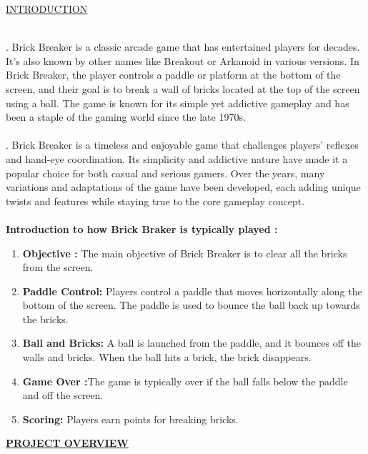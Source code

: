 \documentclass{article}
\begin{document}
\begin{center}
\huge \underline{INTRODUCTION}
\end{center}
\\
\LARGE {}. Brick Breaker is a classic arcade game that has entertained players for decades. It's also known by other names like Breakout or Arkanoid in various versions. In Brick Breaker, the player controls a paddle or platform at the bottom of the screen, and their goal is to break a wall of bricks located at the top of the screen using a ball. The game is known for its simple yet addictive gameplay and has been a staple of the gaming world since the late 1970s. \\
\textbf{}\\
\LARGE {}. Brick Breaker is a timeless and enjoyable game that challenges players' reflexes and hand-eye coordination. Its simplicity and addictive nature have made it a popular choice for both casual and serious gamers. Over the years, many variations and adaptations of the game have been developed, each adding unique twists and features while staying true to the core gameplay concept.\\
\\
\LARGE{\textbf{Introduction to how Brick Braker is typically played :}}
\begin{enumerate}
    \item [\bullet] \textbf{Objective :} The main objective of Brick Breaker is to clear all the bricks from the screen.
    \item[\bullet] \textbf{Paddle Control: } Players control a paddle that moves horizontally along the bottom of the screen. The paddle is used to bounce the ball back up towards the bricks.
    \item [\bullet] \textbf{Ball and Bricks:}  A ball is launched from the paddle, and it bounces off the walls and bricks. When the ball hits a brick, the brick disappears.
    \item [\bullet] \textbf{Game Over :}The game is typically over if the ball falls below the paddle and off the screen. 
    \item[\bullet] \textbf{Scoring: } Players earn points for breaking bricks. 
\end{enumerate}
\pagebreak{}
\begin{center}
    \LARGE \underline{\textbf{PROJECT OVERVIEW }}    
\end{center}
\end{document}
